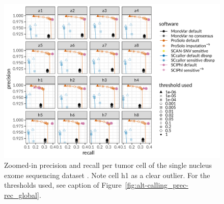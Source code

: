 \documentclass[authoryear,preprint,11pt]{scrartcl}
\begin{document}
\begin{figure}[!tpb]
 \begin{minipage}{\linewidth}
  \includegraphics[width=\linewidth]{figs/Wang2014/Wang2014_prosolo-monovar-scansnv-sccaller-scvilp_per-cell_precision-recall-plot_focus-tools_tumor.pdf} \newline
 \end{minipage}
 \caption{
  Zoomed-in precision and recall per tumor cell of the single nucleus exome sequencing dataset \cite{wang_clonal_2014}.
  Note cell h1 as a clear outlier.\newline \footnotesize
  For the thresholds used, see caption of Figure~\ref{fig:alt-calling_prec-rec_global}.
  }
 \label{fig:wang_alt-calling_prec-rec_per-cell_tumor}
\end{figure}
\end{document}
